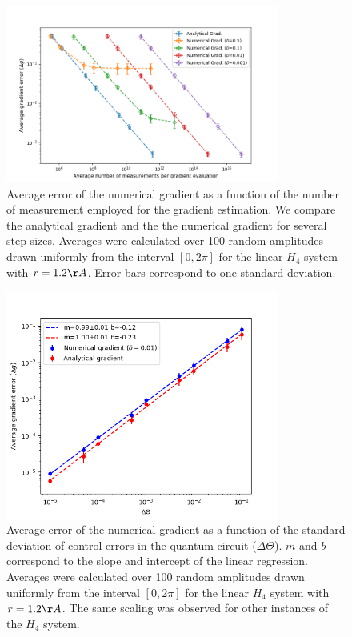 \documentclass[superscriptaddress,aps,pra,twocolumn,nofootinbib,babel]{revtex4-1}
\begin{document}
\begin{figure}
\centering
\includegraphics[width=9cm]{figures/plot2.png}
\caption{Average error of the numerical gradient as a function of the number of measurement employed for the gradient estimation. We compare the analytical gradient and the the numerical gradient for several step sizes. Averages were calculated over 100 random amplitudes drawn uniformly from the interval $[0, 2\pi]$ for the linear $H_4$ system with $r=1.2\AA$. Error bars correspond to one standard deviation.}\label{fig:error_vs_nmeas}
\end{figure}

\begin{figure}
\centering
\includegraphics[width=9cm]{figures/plot3_effect_of_control_noise_0_01.png}
\caption{Average error of the numerical gradient as a function of the standard deviation of control errors in the quantum circuit ($\Delta\Theta$). $m$ and $b$ correspond to the slope and intercept of the linear regression. Averages were calculated over 100 random amplitudes drawn uniformly from the interval $[0, 2\pi]$ for the linear $H_4$ system with $r=1.2\AA$. The same scaling was observed for other instances of the $H_4$ system.}\label{fig:numvscontrolerrors}
\end{figure}
\end{document}
